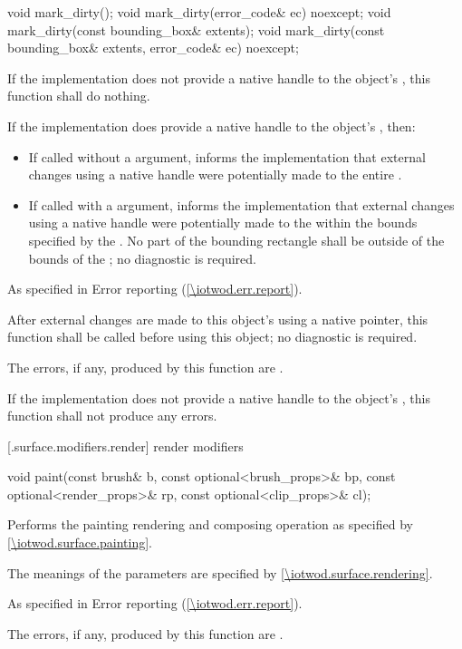 %
\begin{itemdecl}
void mark_dirty();
void mark_dirty(error_code& ec) noexcept;
void mark_dirty(const bounding_box& extents);
void mark_dirty(const bounding_box& extents, error_code& ec) noexcept;
\end{itemdecl}
\begin{itemdescr}
\pnum
\effects
If the implementation does not provide a native handle to the  object's \underlyingsurface, this function shall do nothing.

\pnum
If the implementation does provide a native handle to the  object's \underlyingsurface, then:
\begin{itemize}
\item If called without a  argument, informs the implementation that external changes using a native handle were potentially made to the entire \underlyingsurface.
\item If called with a  argument, informs the implementation that external changes using a native handle were potentially made to the \underlyingsurface within the bounds specified by the  . No part of the bounding rectangle shall be outside of the bounds of the \underlyingsurface; no diagnostic is required.
\end{itemize}

\pnum
\throws
As specified in Error reporting (\ref{\iotwod.err.report}).

\pnum
\remarks
After external changes are made to this  object's \underlyingsurface using a native pointer, this function shall be called before using this  object; no diagnostic is required.

\pnum
\errors
The errors, if any, produced by this function are .

\pnum
If the implementation does not provide a native handle to the  object's \underlyingsurface, this function shall not produce any errors.
\end{itemdescr}

 [\iotwod.surface.modifiers.render] { render modifiers}

%
\begin{itemdecl}
void paint(const brush& b, const optional<brush_props>& bp,
  const optional<render_props>& rp,
  const optional<clip_props>& cl);
\end{itemdecl}
\begin{itemdescr}
\pnum
\effects
Performs the painting rendering and composing operation as specified by \ref{\iotwod.surface.painting}.

\pnum
The meanings of the parameters are specified by \ref{\iotwod.surface.rendering}.

\pnum
\throws
As specified in Error reporting (\ref{\iotwod.err.report}).

\pnum
\errors
The errors, if any, produced by this function are .
\end{itemdescr}

